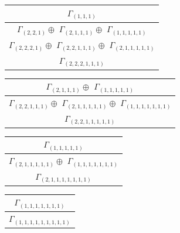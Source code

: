 \documentclass[main.tex]{subfiles}
\begin{document}
\begin{minipage}{.4\textwidth}
\centering
\begin{tabular}{c}
$\Gamma_{(
1 , 
1 , 
1
)}$
\\ \hline
$\Gamma_{(
2 , 
2 , 
1
)} \oplus$
$\Gamma_{(
2 , 
1 , 
1 , 
1
)} \oplus$
$\Gamma_{(
1 , 
1 , 
1 , 
1 , 
1
)}$
\\ \hline
$\Gamma_{(
2 , 
2 , 
2 , 
1
)} \oplus$
$\Gamma_{(
2 , 
2 , 
1 , 
1 , 
1
)} \oplus$
$\Gamma_{(
2 , 
1 , 
1 , 
1 , 
1 , 
1
)}$
\\ \hline
$\Gamma_{(
2 , 
2 , 
2 , 
1 , 
1 , 
1
)}$
\\
\end{tabular}\end{minipage}
\bigskip
\begin{minipage}{.4\textwidth}
\centering
\begin{tabular}{c}
$\Gamma_{(
2 , 
1 , 
1 , 
1
)} \oplus$
$\Gamma_{(
1 , 
1 , 
1 , 
1 , 
1
)}$
\\ \hline
$\Gamma_{(
2 , 
2 , 
1 , 
1 , 
1
)} \oplus$
$\Gamma_{(
2 , 
1 , 
1 , 
1 , 
1 , 
1
)} \oplus$
$\Gamma_{(
1 , 
1 , 
1 , 
1 , 
1 , 
1 , 
1
)}$
\\ \hline
$\Gamma_{(
2 , 
2 , 
1 , 
1 , 
1 , 
1 , 
1
)}$
\\
\end{tabular}\end{minipage}
\begin{minipage}{.4\textwidth}
\centering
\begin{tabular}{c}
$\Gamma_{(
1 , 
1 , 
1 , 
1 , 
1
)}$
\\ \hline
$\Gamma_{(
2 , 
1 , 
1 , 
1 , 
1 , 
1
)} \oplus$
$\Gamma_{(
1 , 
1 , 
1 , 
1 , 
1 , 
1 , 
1
)}$
\\ \hline
$\Gamma_{(
2 , 
1 , 
1 , 
1 , 
1 , 
1 , 
1 , 
1
)}$
\\
\end{tabular}\end{minipage}
\begin{minipage}{.2\textwidth}
\centering
\begin{tabular}{c}
$\Gamma_{(
1 , 
1 , 
1 , 
1 , 
1 , 
1 , 
1
)}$
\\ \hline
$\Gamma_{(
1 , 
1 , 
1 , 
1 , 
1 , 
1 , 
1 , 
1 , 
1
)}$
\\
\end{tabular}\end{minipage}
\end{document}
